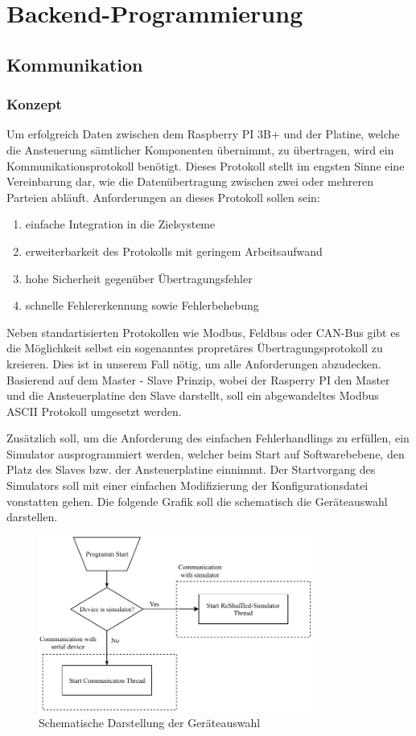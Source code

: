 \section{Backend-Programmierung}\label{sec:backend-programmierung}
\subsection{Kommunikation}
\subsubsection{Konzept}
Um erfolgreich Daten zwischen dem Raspberry PI 3B+ und der Platine, welche die Ansteuerung sämtlicher Komponenten übernimmt, zu übertragen, wird ein Kommunikationsprotokoll benötigt.
Dieses Protokoll stellt im engsten Sinne eine Vereinbarung dar, wie die Datenübertragung zwischen zwei oder mehreren Parteien abläuft.
Anforderungen an dieses Protokoll sollen sein:
\begin{enumerate}
    \item einfache Integration in die Zielsysteme
    \item erweiterbarkeit des Protokolls mit geringem Arbeitsaufwand
    \item hohe Sicherheit gegenüber Übertragungsfehler
    \item schnelle Fehlererkennung sowie Fehlerbehebung
\end{enumerate}
Neben standartisierten Protokollen wie Modbus, Feldbus oder CAN-Bus gibt es die Möglichkeit selbst ein sogenanntes propretäres Übertragungsprotokoll zu kreieren.
Dies ist in unserem Fall nötig, um alle Anforderungen abzudecken.
Basierend auf dem Master - Slave Prinzip, wobei der Rasperry PI den Master und die Ansteuerplatine den Slave darstellt, soll ein abgewandeltes Modbus ASCII Protokoll umgesetzt werden.

Zusätzlich soll, um die Anforderung des einfachen Fehlerhandlings zu erfüllen, ein Simulator ausprogrammiert werden, welcher beim Start auf Softwarebebene, den Platz des Slaves bzw. der Ansteuerplatine einnimmt.
Der Startvorgang des Simulators soll mit einer einfachen Modifizierung der Konfigurationsdatei vonstatten gehen.
Die folgende Grafik soll die schematisch die Geräteauswahl darstellen.
\begin{figure}[H]
    \centering
    \includegraphics[width=0.8\textwidth]{fig/ainf/DeviceSelection}
    \caption{Schematische Darstellung der Geräteauswahl}
\end{figure}
